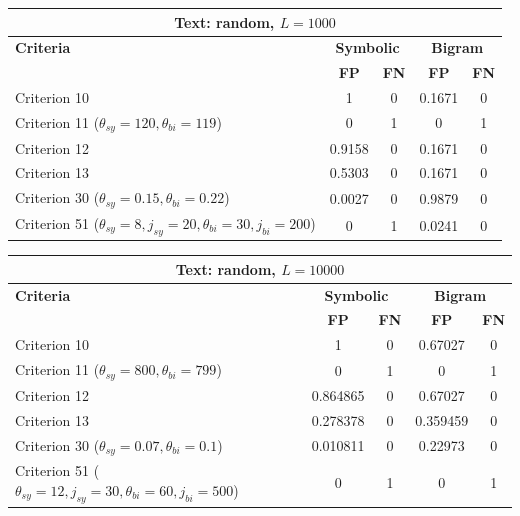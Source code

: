 \begin{center}
\renewcommand{\arraystretch}{1.2}
\setlength{\tabcolsep}{6pt}
\begin{tabular}{|l||c|c||c|c|}
\hline
\multicolumn{5}{|c|}{\textbf{Text: random, $L=1000$}} \\
\hline
\textbf{Criteria} & \multicolumn{2}{c||}{\textbf{Symbolic}} & \multicolumn{2}{c|}{\textbf{Bigram}} \\
\hline
 & \textbf{FP} & \textbf{FN} & \textbf{FP} & \textbf{FN} \\
\hline
Criterion 10 & 1 & 0 & 0.1671 & 0 \\
Criterion 11 ($\theta_{sy}=120, \theta_{bi}=119$) & 0 & 1 & 0 & 1 \\
Criterion 12 & 0.9158 & 0 & 0.1671 & 0 \\
Criterion 13 & 0.5303 & 0 & 0.1671 & 0 \\
Criterion 30 ($\theta_{sy}=0.15, \theta_{bi}=0.22$) & 0.0027 & 0 & 0.9879 & 0 \\
Criterion 51 ($\theta_{sy}=8, j_{sy}=20, \theta_{bi}=30, j_{bi}=200$) & 0 & 1 & 0.0241 & 0 \\
\hline
\end{tabular}
\end{center}

\begin{center}
\renewcommand{\arraystretch}{1.2}
\setlength{\tabcolsep}{6pt}
\begin{tabular}{|l||c|c||c|c|}
\hline
\multicolumn{5}{|c|}{\textbf{Text: random, $L=10000$}} \\
\hline
\textbf{Criteria} & \multicolumn{2}{c||}{\textbf{Symbolic}} & \multicolumn{2}{c|}{\textbf{Bigram}} \\
\hline
 & \textbf{FP} & \textbf{FN} & \textbf{FP} & \textbf{FN} \\
\hline
Criterion 10 & 1 & 0 & 0.67027 & 0 \\
Criterion 11 ($\theta_{sy}=800, \theta_{bi}=799$) & 0 & 1 & 0 & 1 \\
Criterion 12 & 0.864865 & 0 & 0.67027 & 0 \\
Criterion 13 & 0.278378 & 0 & 0.359459 & 0 \\
Criterion 30 ($\theta_{sy}=0.07, \theta_{bi}=0.1$) & 0.010811 & 0 & 0.22973 & 0 \\
Criterion 51 ($\theta_{sy}=12, j_{sy}=30, \theta_{bi}=60, j_{bi}=500$) & 0 & 1 & 0 & 1 \\
\hline
\end{tabular}
\end{center}
